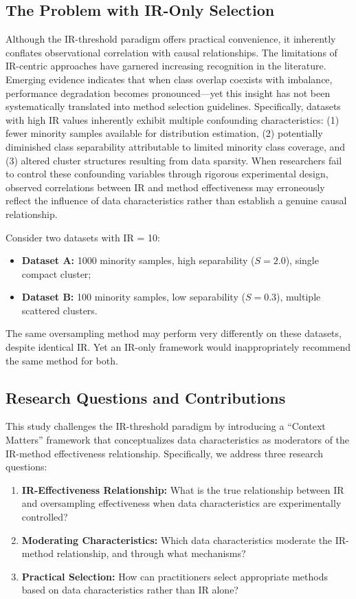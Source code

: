\documentclass[12pt,a4paper]{article}
\theoremstyle{definition}
\begin{document}
\subsection{The Problem with IR-Only Selection}
Although the IR-threshold paradigm offers practical convenience, it inherently conflates observational correlation with causal relationships. The limitations of IR-centric approaches have garnered increasing recognition in the literature. Emerging evidence indicates that when class overlap coexists with imbalance, performance degradation becomes pronounced---yet this insight has not been systematically translated into method selection guidelines. Specifically, datasets with high IR values inherently exhibit multiple confounding characteristics: (1) fewer minority samples available for distribution estimation, (2) potentially diminished class separability attributable to limited minority class coverage, and (3) altered cluster structures resulting from data sparsity. When researchers fail to control these confounding variables through rigorous experimental design, observed correlations between IR and method effectiveness may erroneously reflect the influence of data characteristics rather than establish a genuine causal relationship.

Consider two datasets with IR = 10:
\begin{itemize}
 \item \textbf{Dataset A:} 1000 minority samples, high separability ($S=2.0$), single compact cluster;
 \item \textbf{Dataset B:} 100 minority samples, low separability ($S=0.3$), multiple scattered clusters.
\end{itemize}
The same oversampling method may perform very differently on these datasets, despite identical IR. Yet an IR-only framework would inappropriately recommend the same method for both.

\subsection{Research Questions and Contributions}
This study challenges the IR-threshold paradigm by introducing a ``Context Matters'' framework that conceptualizes data characteristics as moderators of the IR-method effectiveness relationship. Specifically, we address three research questions:

\begin{enumerate}
 \item[RQ1] \textbf{IR-Effectiveness Relationship:} What is the true relationship between IR and oversampling effectiveness when data characteristics are experimentally controlled?
 \item[RQ2] \textbf{Moderating Characteristics:} Which data characteristics moderate the IR-method relationship, and through what mechanisms?
 \item[RQ3] \textbf{Practical Selection:} How can practitioners select appropriate methods based on data characteristics rather than IR alone?
\end{enumerate}
\end{document}
